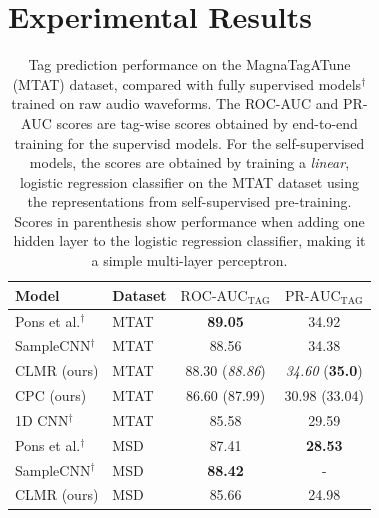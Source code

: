 \chapter{Experimental Results}\label{sec:results}
\begin{table}
    \centering
    \begin{tabular}{@{}llcc@{}}\toprule
        Model & Dataset & $\text{ROC-AUC}_\text{TAG}$ & $\text{PR-AUC}_\text{TAG}$ \\ \midrule
        Pons et al.$^\dagger$ & MTAT & \textbf{89.05} & 34.92 \\
        SampleCNN$^\dagger$ & MTAT & 88.56 & 34.38 \\
        CLMR (ours) & MTAT & 88.30 (\textit{88.86}) & \textit{34.60} (\textbf{35.0}) \\
        CPC (ours) & MTAT & 86.60 (87.99) & 30.98 (33.04) \\
        1D CNN$^\dagger$ & MTAT & 85.58 & 29.59 \\\midrule
        Pons et al.$^\dagger$ & MSD & 87.41 & \textbf{28.53} \\
        SampleCNN$^\dagger$ & MSD & \textbf{88.42} & - \\
        CLMR (ours) & MSD & 85.66 & 24.98 \\
        \bottomrule
    \end{tabular}
    \caption{Tag prediction performance on the MagnaTagATune (MTAT) dataset, compared with fully supervised models$^\dagger$ trained on raw audio waveforms.
The ROC-AUC and PR-AUC scores are tag-wise scores obtained by end-to-end training for the supervisd models.
For the self-supervised models, the scores are obtained by training a \emph{linear}, logistic regression classifier on the MTAT dataset using the representations from self-supervised pre-training.
Scores in parenthesis show performance when adding one hidden layer to the logistic regression classifier, making it a simple multi-layer perceptron.}
    \label{tab:magnatagatune_results}
\end{table}

